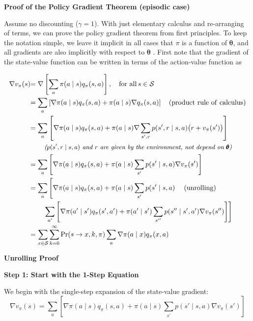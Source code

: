 \documentclass{article}
\begin{document}
\textbf{Proof of the Policy Gradient Theorem (episodic case)}

Assume no discounting ($\gamma = 1$). With just elementary calculus and re-arranging of terms, we can prove the policy gradient theorem from first principles. To keep the notation simple, we leave it implicit in all cases that $\pi$ is a function of $\pmb{\theta}$, and all gradients are also implicitly with respect to $\pmb{\theta}$ . 
First note that the gradient of the state-value function can be written in terms of the action-value function as

$$
\begin{aligned} 
{\nabla v_{\pi}(s)} & {= \nabla \left[ \sum_{a} \pi(a \mid s) q_{\pi}(s, a) \right], \quad \operatorname{for ~ all} s \in \mathcal{S}} \\ 
& {= \sum_{a} \left[ \nabla \pi(a \mid s) q_{\pi}(s, a) + \pi(a \mid s) \nabla q_{\pi}(s, a) \right] \quad (\operatorname{product ~ rule ~ of ~ calculus})} \\ 
& {= \sum_{a} \left[ \nabla \pi(a \mid s) q_{\pi}(s, a) + \pi(a \mid s) \nabla \sum_{s^{\prime}, r} p(s^{\prime}, r \mid s, a) \big( r + v_{\pi}(s^{\prime}) \big) \right]} \\ 
& \quad \quad \text{\small \textit{($p(s^{\prime}, r \mid s, a)$ and $r$ are given by the environment, not depend on $\pmb{\theta}$)}} \\
& {= \sum_{a} \left[ \nabla \pi(a \mid s) q_{\pi}(s, a) + \pi(a \mid s) \sum_{s^{\prime}} p(s^{\prime} \mid s, a) \nabla v_{\pi}(s^{\prime}) \right]} \\ 
& {= \sum_{a} \left[ \nabla \pi(a \mid s) q_{\pi}(s, a) + \pi(a \mid s) \sum_{s^{\prime}} p(s^{\prime} \mid s, a) \right. \quad (\operatorname{unrolling})} \\ 
& { \quad \quad \left. \sum_{a^{\prime}} \left[ \nabla \pi(a^{\prime} \mid s^{\prime}) q_{\pi}(s^{\prime}, a^{\prime}) + \pi(a^{\prime} \mid s^{\prime}) \sum_{s^{\prime\prime}} p(s^{\prime\prime} \mid s^{\prime}, a^{\prime}) \nabla v_{\pi}(s^{\prime\prime}) \right] \right]} \\ 
& {= \sum_{x \in \mathcal{S}} \sum_{k=0}^{\infty} \operatorname{Pr}(s \to x, k, \pi) \sum_{a} \nabla \pi(a \mid x) q_{\pi}(x, a)} \\ 
\end{aligned}
$$

\textbf{Unrolling Proof}

\textbf{Step 1: Start with the 1-Step Equation}

We begin with the single-step expansion of the state-value gradient:
\begin{equation*}
\nabla v_{\pi}(s) = \sum_{a} \left[ \nabla \pi(a \mid s) q_{\pi}(s, a) + \pi(a \mid s) \sum_{s'} p(s' \mid s, a) \nabla v_{\pi}(s') \right]
\end{equation*}
\end{document}
